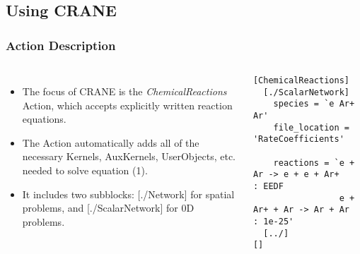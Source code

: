 \subsection{Using CRANE}
	\begin{frame}[fragile]
		\frametitle{Action Description}
		\begin{columns}
			\begin{itemize}
				\item The focus of CRANE is the \textit{ChemicalReactions} Action, which accepts explicitly written reaction equations.
				\item The Action automatically adds all of the necessary Kernels, AuxKernels, UserObjects, etc. needed to solve equation (1).
				\item It includes two subblocks: [./Network] for spatial problems, and [./ScalarNetwork] for 0D problems.
			\end{itemize}
			\begin{Verbatim}[fontsize=\tiny]
[ChemicalReactions]
  [./ScalarNetwork]
    species = `e Ar+ Ar'
    file_location = 'RateCoefficients'

    reactions = `e + Ar -> e + e + Ar+      : EEDF
                 e + Ar+ + Ar -> Ar + Ar    : 1e-25'
  [../]
[]
			\end{Verbatim}
		\end{columns}
	\end{frame}

